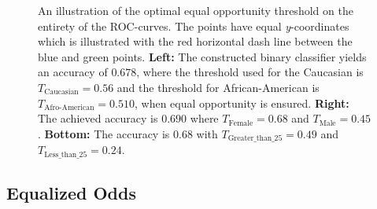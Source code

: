 \documentclass[11pt, fleqn, titlepage]{article}
\begin{document}
\begin{figure}[H]
\begin{center}
\begin{subfigure}{0.5\textwidth}
		\end{subfigure}
		\end{center}
		\caption{An illustration of the optimal equal opportunity threshold on the entirety of the ROC-curves. The points have equal \textit{y}-coordinates which is illustrated with the red horizontal dash line between the blue and green points. \textbf{Left:} The constructed binary classifier yields an accuracy of $ 0.678 $, where the threshold used for the Caucasian is $T_{\text{Caucasian}}= 0.56 $ and the threshold for African-American is $ T_{\text{Afro-American}}=0.510 $, when equal opportunity is ensured. \textbf{Right:} The achieved accuracy is $0.690$ where $T_{\text{Female}}= 0.68$ and $T_{\text{Male}}= 0.45$. \textbf{Bottom:} The accuracy is $0.68$ with $T_{\text{Greater\_than\_{25}}}= 0.49$ and $T_{\text{Less\_than\_{25}}}= 0.24$.}
		\label{fig:equal-opportunity-optimal}
	\end{figure}
	
	\subsection{Equalized Odds}\label{equalizedOdds}
	
\end{document}
